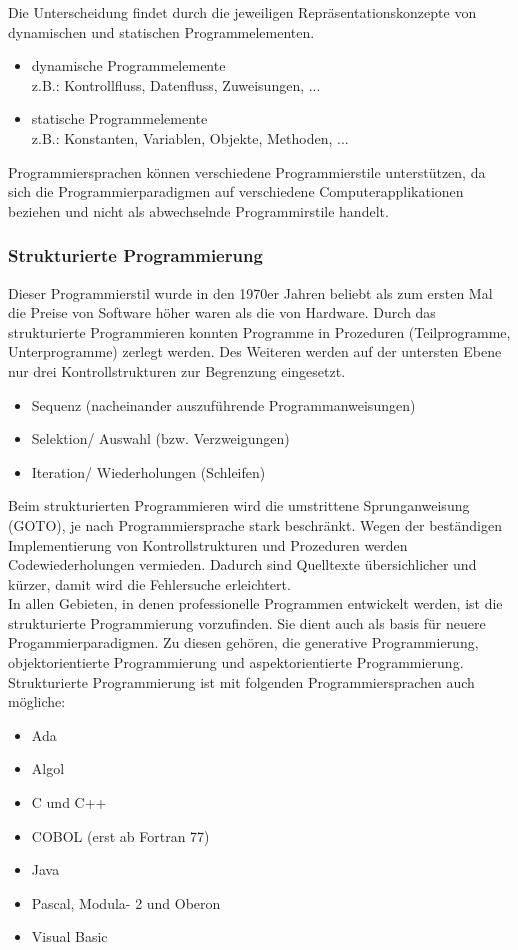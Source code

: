 \documentclass[12pt,a4paper]{report}
\begin{document}
Die Unterscheidung findet durch die jeweiligen Repräsentationskonzepte von dynamischen und statischen Programmelementen.
\begin{itemize}
\item dynamische Programmelemente\\
z.B.: Kontrollfluss, Datenfluss, Zuweisungen, ...
\item statische Programmelemente\\
z.B.: Konstanten, Variablen, Objekte, Methoden, ...
\end{itemize}
Programmiersprachen können verschiedene Programmierstile unterstützen, da sich die Programmierparadigmen auf verschiedene Computerapplikationen beziehen und nicht als abwechselnde Programmirstile handelt.

\subsubsection{Strukturierte Programmierung}
Dieser Programmierstil wurde in den 1970er Jahren beliebt als zum ersten Mal die Preise von Software höher waren als die von Hardware. Durch das strukturierte Programmieren konnten Programme in Prozeduren (Teilprogramme, Unterprogramme) zerlegt werden. Des Weiteren werden auf der untersten Ebene nur drei Kontrollstrukturen zur Begrenzung eingesetzt.
\begin{itemize}
\item Sequenz (nacheinander auszuführende Programmanweisungen)
\item Selektion/ Auswahl (bzw. Verzweigungen)
\item Iteration/ Wiederholungen (Schleifen)
\end{itemize}
Beim strukturierten Programmieren wird die umstrittene Sprunganweisung (GOTO), je nach Programmiersprache stark beschränkt. Wegen der beständigen Implementierung von Kontrollstrukturen und Prozeduren werden Codewiederholungen vermieden. Dadurch sind Quelltexte übersichlicher und kürzer, damit wird die Fehlersuche erleichtert.\\

In allen Gebieten, in denen professionelle Programmen entwickelt werden, ist die strukturierte Programmierung vorzufinden. Sie dient auch als basis für neuere Progammierparadigmen. Zu diesen gehören, die generative Programmierung, objektorientierte Programmierung und aspektorientierte Programmierung.
\\Strukturierte Programmierung ist mit folgenden Programmiersprachen auch mögliche:
\begin{itemize}
\item Ada
\item Algol
\item C und C++
\item COBOL (erst ab Fortran 77)
\item Java
\item Pascal, Modula- 2 und Oberon
\item Visual Basic
\end{itemize}
\end{document}

